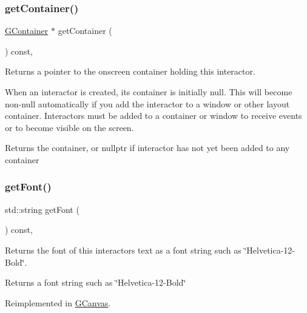 \subsubsection{\texorpdfstring{get\+Container()}{getContainer()}}
{\footnotesize\ttfamily \mbox{\hyperlink{classsgl_1_1GContainer}{G\+Container}} $\ast$ get\+Container (\begin{DoxyParamCaption}{ }\end{DoxyParamCaption}) const\hspace{0.3cm}{\ttfamily [virtual]}, {\ttfamily [inherited]}}



Returns a pointer to the onscreen container holding this interactor. 

When an interactor is created, its container is initially null. This will become non-\/null automatically if you add the interactor to a window or other layout container. Interactors must be added to a container or window to receive events or to become visible on the screen. \begin{DoxyReturn}{Returns}
the container, or nullptr if interactor has not yet been added to any container 
\end{DoxyReturn}
\mbox{\label{classsgl_1_1GInteractor_a894a5502900794eeb27d084c21f1d77d}} 
\subsubsection{\texorpdfstring{get\+Font()}{getFont()}}
{\footnotesize\ttfamily std\+::string get\+Font (\begin{DoxyParamCaption}{ }\end{DoxyParamCaption}) const\hspace{0.3cm}{\ttfamily [virtual]}, {\ttfamily [inherited]}}



Returns the font of this interactor\textquotesingle{}s text as a font string such as \char`\"{}\+Helvetica-\/12-\/\+Bold\char`\"{}. 

\begin{DoxyReturn}{Returns}
a font string such as \char`\"{}\+Helvetica-\/12-\/\+Bold\char`\"{} 
\end{DoxyReturn}


Reimplemented in \mbox{\hyperlink{classsgl_1_1GCanvas_aa0829769ac6325b5c58d27c8e363cb78}{G\+Canvas}}.

